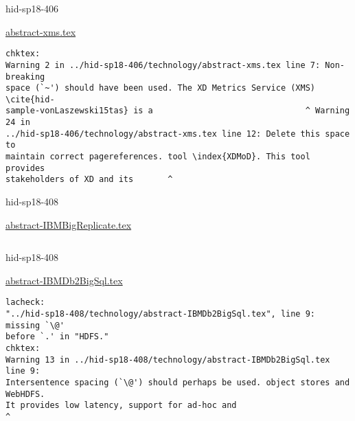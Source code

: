 \begin{IU}

hid-sp18-406

\href{https://github.com/cloudmesh-community/hid-sp18-406/blob/master//technology/abstract-xms.tex}{abstract-xms.tex}

\begin{tiny}
\begin{verbatim}
chktex:
Warning 2 in ../hid-sp18-406/technology/abstract-xms.tex line 7: Non-breaking
space (`~') should have been used. The XD Metrics Service (XMS) \cite{hid-
sample-vonLaszewski15tas} is a                               ^ Warning 24 in
../hid-sp18-406/technology/abstract-xms.tex line 12: Delete this space to
maintain correct pagereferences. tool \index{XDMoD}. This tool provides
stakeholders of XD and its       ^
\end{verbatim}
\end{tiny}
\end{IU}



\begin{IU}

hid-sp18-408

\href{https://github.com/cloudmesh-community/hid-sp18-408/blob/master//technology/abstract-IBMBigReplicate.tex}{abstract-IBMBigReplicate.tex}

\begin{tiny}
\begin{verbatim}
\end{verbatim}
\end{tiny}
\end{IU}



\begin{IU}

hid-sp18-408

\href{https://github.com/cloudmesh-community/hid-sp18-408/blob/master//technology/abstract-IBMDb2BigSql.tex}{abstract-IBMDb2BigSql.tex}

\begin{tiny}
\begin{verbatim}
lacheck:
"../hid-sp18-408/technology/abstract-IBMDb2BigSql.tex", line 9: missing `\@'
before `.' in "HDFS."
chktex:
Warning 13 in ../hid-sp18-408/technology/abstract-IBMDb2BigSql.tex line 9:
Intersentence spacing (`\@') should perhaps be used. object stores and WebHDFS.
It provides low latency, support for ad-hoc and                             ^
\end{verbatim}
\end{tiny}
\end{IU}

